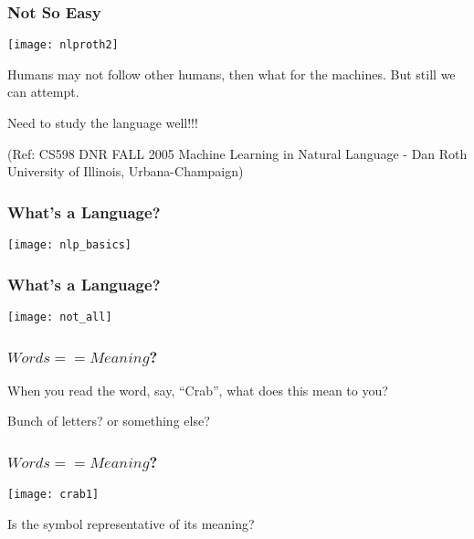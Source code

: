 \begin{frame}[fragile]\frametitle{Not So Easy}
\begin{center}
\texttt{[image: nlproth2]}
\end{center}

Humans may not follow other humans, then what for the machines. But still we can attempt.

Need to study the language well!!!

\tiny{(Ref: CS598 DNR FALL 2005 Machine Learning in Natural Language - Dan Roth
University of Illinois, Urbana-Champaign)}
\end{frame}

\begin{frame}[fragile]\frametitle{What's a Language?}
\begin{center}
\texttt{[image: nlp\_basics]}
\end{center}
\end{frame}

\begin{frame}[fragile]\frametitle{What's a Language?}
\begin{center}
\texttt{[image: not\_all]}
\end{center}
\end{frame}



\begin{frame}[fragile] \frametitle{$Words == Meaning$?}
 \begin{center}
When you read the word, say, ``Crab'', what does this mean to you?



Bunch of letters? or something else?
\end{center}
\end{frame}

\begin{frame}[fragile] \frametitle{$Words == Meaning$?}
\begin{center}
\texttt{[image: crab1]}
\end{center}
Is the symbol representative of its meaning? 
\end{frame}


